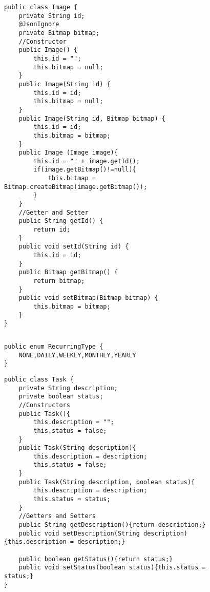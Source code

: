 \begin{figure}[H]
\begin{lstlisting}[caption=Image (Jan Beilfuß)]
public class Image {
    private String id;
    @JsonIgnore
    private Bitmap bitmap;
    //Constructor
    public Image() {
        this.id = "";
        this.bitmap = null;
    }
    public Image(String id) {
        this.id = id;
        this.bitmap = null;
    }
    public Image(String id, Bitmap bitmap) {
        this.id = id;
        this.bitmap = bitmap;
    }
    public Image (Image image){
        this.id = "" + image.getId();
        if(image.getBitmap()!=null){
            this.bitmap = Bitmap.createBitmap(image.getBitmap());
        }
    }
    //Getter and Setter
    public String getId() {
        return id;
    }
    public void setId(String id) {
        this.id = id;
    }
    public Bitmap getBitmap() {
        return bitmap;
    }
    public void setBitmap(Bitmap bitmap) {
        this.bitmap = bitmap;
    }
}
\end{lstlisting}
\end{figure}

\begin{figure}[H]
\begin{lstlisting}[caption=MockData (Jan Beilfuß)]

\end{lstlisting}
\end{figure}

\begin{figure}[H]
\begin{lstlisting}[caption=ReccuringType (Joscha Nassenstein)]
public enum RecurringType {
    NONE,DAILY,WEEKLY,MONTHLY,YEARLY
}
\end{lstlisting}
\end{figure}

\begin{figure}[H]
\begin{lstlisting}[caption=Tasks (Joscha Nassenstein)]
public class Task {
    private String description;
    private boolean status;
    //Constructors
    public Task(){
        this.description = "";
        this.status = false;
    }
    public Task(String description){
        this.description = description;
        this.status = false;
    }
    public Task(String description, boolean status){
        this.description = description;
        this.status = status;
    }
    //Getters and Setters
    public String getDescription(){return description;}
    public void setDescription(String description) {this.description = description;}

    public boolean getStatus(){return status;}
    public void setStatus(boolean status){this.status = status;}
}
\end{lstlisting}
\end{figure}
